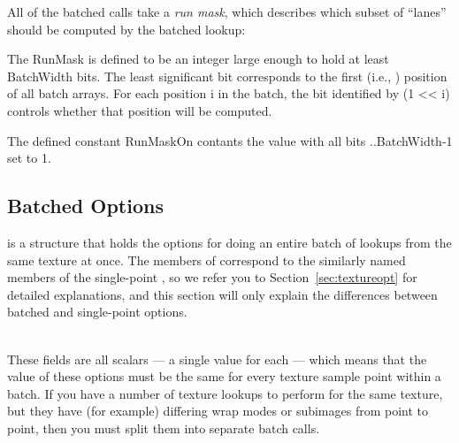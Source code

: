 All of the batched calls take a \emph{run mask}, which describes which
subset of ``lanes'' should be computed by the batched lookup:


The {\cf RunMask} is defined to be an integer large enough to hold at least
{\cf BatchWidth} bits. The least significant bit corresponds to the first
(i.e., {\cf [0]}) position of all batch arrays. For each position
{\cf i} in the batch, the bit identified by {\cf (1 << i)} controls whether
that position will be computed.

The defined constant {\cf RunMaskOn} contants the value with all bits
{..BatchWidth-1} set to 1.
\apiend

\subsection{Batched Options}

\label{sec:textureoptbatch}

\TextureOptBatch is a structure that holds the options for doing an entire
batch of lookups from the same texture at once.
The members of \TextureOptBatch correspond to the similarly named members of
the single-point \TextureOpt, so we refer you to
Section~\ref{sec:textureopt} for detailed explanations, and this section
will only explain the differences between batched and single-point options.

 ~\\
These fields are all scalars --- a single value for each \TextureOptBatch
--- which means that the value of these options must be the same for every
texture sample point within a batch. If you have a number of texture lookups
to perform for the same texture, but they have (for example) differing wrap
modes or subimages from point to point, then you must split them into
separate batch calls.
\apiend

